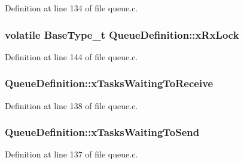 Definition at line 134 of file queue.\+c.

\subsubsection[{\texorpdfstring{x\+Rx\+Lock}{xRxLock}}]{\setlength{\rightskip}{0pt plus 5cm}volatile {\bf Base\+Type\+\_\+t} Queue\+Definition\+::x\+Rx\+Lock}\hypertarget{struct_queue_definition_acfda1aacb3043fab24087782f996dc8b}{}\label{struct_queue_definition_acfda1aacb3043fab24087782f996dc8b}


Definition at line 144 of file queue.\+c.

\subsubsection[{\texorpdfstring{x\+Tasks\+Waiting\+To\+Receive}{xTasksWaitingToReceive}}]{ Queue\+Definition\+::x\+Tasks\+Waiting\+To\+Receive}\hypertarget{struct_queue_definition_af6d61526f77beee659cd604a0c473359}{}\label{struct_queue_definition_af6d61526f77beee659cd604a0c473359}


Definition at line 138 of file queue.\+c.

\subsubsection[{\texorpdfstring{x\+Tasks\+Waiting\+To\+Send}{xTasksWaitingToSend}}]{ Queue\+Definition\+::x\+Tasks\+Waiting\+To\+Send}\hypertarget{struct_queue_definition_aaab135c4345cb0393d6ff3cd5164c7b2}{}\label{struct_queue_definition_aaab135c4345cb0393d6ff3cd5164c7b2}


Definition at line 137 of file queue.\+c.

